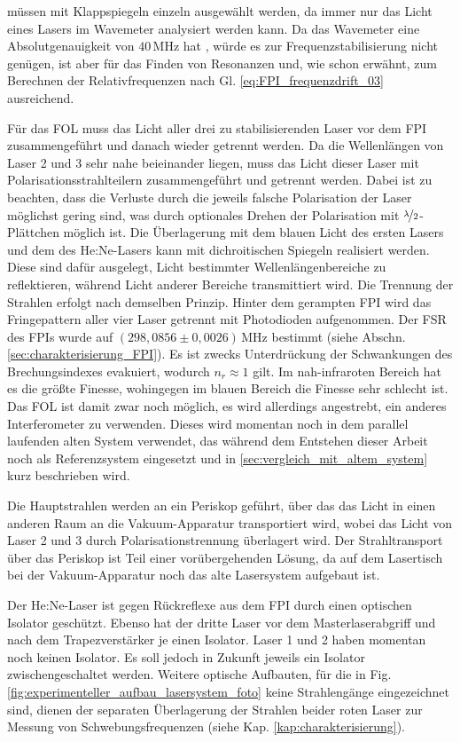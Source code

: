 müssen mit Klappspiegeln einzeln ausgewählt werden, da immer nur das Licht eines Lasers im Wavemeter analysiert werden kann. Da das Wavemeter eine
Absolutgenauigkeit von $40\,$MHz hat
\cite{wavemeter_hardware_guide}, würde es zur Frequenzstabilisierung nicht
genügen, ist aber für das Finden von Resonanzen und, wie schon erwähnt, zum
Berechnen der Relativfrequenzen nach Gl. \eqref{eq:FPI_frequenzdrift_03} ausreichend.\par Für das FOL muss das Licht aller drei zu stabilisierenden
Laser vor dem FPI zusammengeführt und danach wieder getrennt werden. Da die
Wellenlängen von Laser 2 und 3 sehr nahe beieinander liegen, muss das Licht
dieser Laser mit Polarisationsstrahlteilern zusammengeführt und getrennt werden.
Dabei ist zu beachten, dass die Verluste durch die jeweils falsche Polarisation
der Laser möglichst gering sind, was durch optionales Drehen der
Polarisation mit $\nicefrac{\lambda}{2}$-Plättchen möglich ist. Die Überlagerung
mit dem blauen Licht des ersten Lasers und dem des He:Ne-Lasers kann mit
dichroitischen Spiegeln realisiert werden. Diese sind dafür ausgelegt, Licht
bestimmter Wellenlängenbereiche zu reflektieren, während Licht anderer  Bereiche
transmittiert wird. Die Trennung der Strahlen erfolgt nach demselben Prinzip.
Hinter dem gerampten FPI wird das Fringepattern aller vier Laser getrennt mit
Photodioden aufgenommen. Der FSR des FPIs wurde auf $(298,0856\pm0,0026)\,$MHz
bestimmt (siehe Abschn. \ref{sec:charakterisierung_FPI}).
Es ist zwecks Unterdrückung der Schwankungen des Brechungsindexes evakuiert,
wodurch $n_r\approx1$ gilt. Im nah-infraroten Bereich hat es die größte Finesse, wohingegen im blauen Bereich
die Finesse sehr schlecht ist. Das FOL ist damit zwar noch
möglich, es wird allerdings angestrebt, ein anderes Interferometer zu verwenden.
Dieses wird momentan noch in dem parallel laufenden alten System verwendet, das
während dem Entstehen dieser Arbeit noch als Referenzsystem eingesetzt und in
\ref{sec:vergleich_mit_altem_system} kurz beschrieben wird.\par
Die Hauptstrahlen werden an ein Periskop geführt, über das das Licht in einen
anderen Raum an die Vakuum-Apparatur transportiert wird, wobei das Licht von
Laser 2 und 3 durch Polarisationstrennung überlagert wird. Der
Strahltransport über das Periskop ist Teil einer vorübergehenden Lösung, da auf
dem Lasertisch bei der Vakuum-Apparatur noch das alte Lasersystem aufgebaut
ist.\par Der He:Ne-Laser ist gegen Rückreflexe aus dem FPI durch einen optischen Isolator
geschützt. Ebenso hat der dritte Laser vor dem Masterlaserabgriff und nach dem
Trapezverstärker je einen Isolator. Laser 1 und 2 haben momentan noch keinen
Isolator. Es soll jedoch in Zukunft jeweils ein Isolator zwischengeschaltet
werden. Weitere optische Aufbauten, für die in Fig.
\ref{fig:experimenteller_aufbau_lasersystem_foto} keine Strahlengänge eingezeichnet
sind, dienen der separaten Überlagerung der Strahlen beider roten Laser zur
Messung von Schwebungsfrequenzen (siehe Kap. \ref{kap:charakterisierung}).

